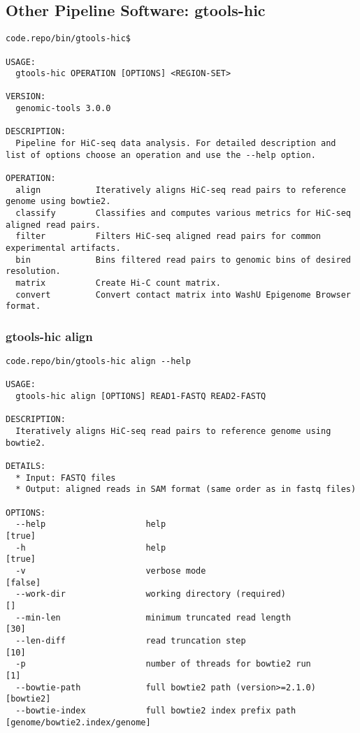 \subsection[gtools-hic]{Other Pipeline Software: gtools-hic}\label{gtools-hic}%
% 
\begin{lstlisting}
code.repo/bin/gtools-hic$

USAGE:
  gtools-hic OPERATION [OPTIONS] <REGION-SET>

VERSION:
  genomic-tools 3.0.0

DESCRIPTION:
  Pipeline for HiC-seq data analysis. For detailed description and list of options choose an operation and use the --help option.

OPERATION:
  align           Iteratively aligns HiC-seq read pairs to reference genome using bowtie2.
  classify        Classifies and computes various metrics for HiC-seq aligned read pairs.
  filter          Filters HiC-seq aligned read pairs for common experimental artifacts.
  bin             Bins filtered read pairs to genomic bins of desired resolution.
  matrix          Create Hi-C count matrix.
  convert         Convert contact matrix into WashU Epigenome Browser format.
\end{lstlisting}
%
\subsubsection{gtools-hic align}\label{gtools-hic_align}
\begin{lstlisting}
code.repo/bin/gtools-hic align --help

USAGE:
  gtools-hic align [OPTIONS] READ1-FASTQ READ2-FASTQ

DESCRIPTION:
  Iteratively aligns HiC-seq read pairs to reference genome using bowtie2.

DETAILS:
  * Input: FASTQ files
  * Output: aligned reads in SAM format (same order as in fastq files)

OPTIONS:
  --help                    help                                                           [true]
  -h                        help                                                           [true]
  -v                        verbose mode                                                   [false]
  --work-dir                working directory (required)                                   []
  --min-len                 minimum truncated read length                                  [30]
  --len-diff                read truncation step                                           [10]
  -p                        number of threads for bowtie2 run                              [1]
  --bowtie-path             full bowtie2 path (version>=2.1.0)                             [bowtie2]
  --bowtie-index            full bowtie2 index prefix path                                 [genome/bowtie2.index/genome]
\end{lstlisting}
%
